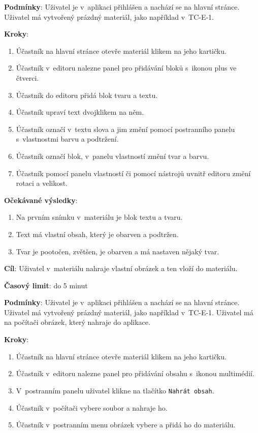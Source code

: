 \textbf{Podmínky}:  Uživatel je v~aplikaci přihlášen a nachází se na hlavní stránce. Uživatel má vytvořený prázdný materiál, jako například v~TC-E-1.

\textbf{Kroky}:

\begin{enumerate}[leftmargin=1.4cm]
    \item Účastník na hlavní stránce otevře materiál klikem na jeho kartičku.
    \item Účastník v~editoru nalezne panel pro přidávání bloků s~ikonou plus ve čtverci.
    \item Účastník do editoru přidá blok tvaru a textu.
    \item Účastník upraví text dvojklikem na něm.
    \item Účastník označí v~textu slova a jim změní pomocí postranního panelu s~vlastnostmi barvu a podtržení.
    \item Účastník označí blok, v~panelu vlastností změní tvar a barvu.
    \item Účastník pomocí panelu vlastností či pomocí nástrojů uvnitř editoru změní rotaci a velikost.
\end{enumerate}

\textbf{Očekávané výsledky}:

\begin{enumerate}[leftmargin=1.4cm]
    \item Na prvním snímku v~materiálu je blok textu a tvaru.
    \item Text má vlastní obsah, který je obarven a podtržen.
    \item Tvar je pootočen, zvětšen, je obarven a má nastaven nějaký tvar. 
\end{enumerate}






\vspace{1em}

\textbf{Cíl}: Uživatel v~materiálu nahraje vlastní obrázek a ten vloží do materiálu.

\textbf{Časový limit}: do 5 minut

\textbf{Podmínky}:  Uživatel je v~aplikaci přihlášen a nachází se na hlavní stránce. Uživatel má vytvořený prázdný materiál, jako například v~TC-E-1. Uživatel má na počítači obrázek, který nahraje do aplikace.

\textbf{Kroky}:

\begin{enumerate}[leftmargin=1.4cm]
    \item Účastník na hlavní stránce otevře materiál klikem na jeho kartičku.
    \item Účastník v~editoru nalezne panel pro přidávání obsahu s~ikonou multimédií.
    \item V~postranním panelu uživatel klikne na tlačítko \verb|Nahrát obsah|.
    \item Účastník v~počítači vybere soubor a nahraje ho.
    \item Účastník v~postranním menu obrázek vybere a přidá ho do materiálu.
\end{enumerate}

